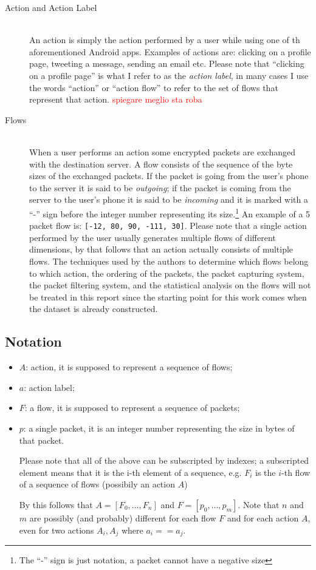 \documentclass[a4paper,10pt]{scrartcl}
\newcommand\todo[1]{\textcolor{red}{#1}}
\begin{document}
\begin{description}
  \item[Action and Action Label] \hfill \\ An action is simply the action performed by a user while using one of th aforementioned Android apps. Examples of actions are: clicking on a profile page, tweeting a message, sending an email etc. Please note that ``clicking on a profile page'' is what I refer to as the \textit{action label}, in many cases I use the words ``action'' or ``action flow'' to refer to the set of flows that represent that action. \todo{spiegare meglio sta roba}
  \item[Flows] \hfill \\ When a user performs an action some encrypted packets are exchanged with the destination server. A flow consists of the sequence of the byte sizes of the exchanged packets. If the packet is going from the user's phone to the server it is said to be \textit{outgoing}; if the packet is coming from the server to the user's phone it is said to be \textit{incoming} and it is marked with a ``-'' sign before the integer number representing its size.\footnote{The ``-'' sign is just notation, a packet cannot have a negative size} An example of a 5 packet flow is: \texttt{[-12, 80, 90, -111, 30]}. Please note that a single action performed by the user usually generates multiple flows of different dimensions, by that follows that an action actually consists of multiple flows. The techniques used by the authors to determine which flows belong to which action, the ordering of the packets, the packet capturing system, the packet filtering system, and the statistical analysis on the flows will not be treated in this report since the starting point for this work comes when the dataset is already constructed.
\end{description}

\subsection{Notation}
\label{subsec:notation}
\begin{itemize}
 \item $ A $: action, it is supposed to represent a sequence of flows;
 \item $ a $: action label;
 \item $ F $: a flow, it is supposed to represent a sequence of packets;
 \item $ p $: a single packet, it is an integer number representing the size in bytes of that packet.
 
 Please note that all of the above can be subscripted by indexes; a subscripted element means that it is the i-th element of a sequence, e.g. $F_i$ is the $i$-th flow of a sequence of flows (possibily an action $A$)
 
 By this follows that $A = [F_0, \dots, F_n]$ and $F = [p_0,\dots, p_m]$. Note that $n$ and $m$ are possibly (and probably) different for each flow $F$ and for each action $A$, even for two actions $A_i, A_j$ where $a_i == a_j$.
\end{itemize}
\end{document}
